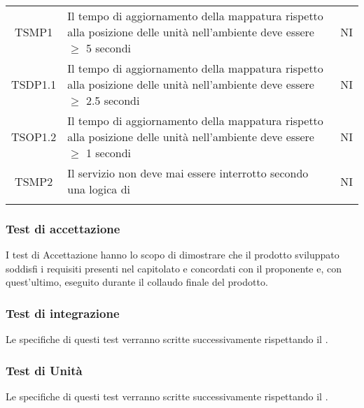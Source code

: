 \begin{longtable}[h!] { c  m{12cm} c}
		\hline
		
		TSMP1  &  Il tempo di aggiornamento della mappatura rispetto alla posizione delle unità nell'ambiente deve essere $\geq$ 5 secondi & NI \\
	
		TSDP1.1  & Il tempo di aggiornamento della mappatura rispetto alla posizione delle unità nell'ambiente deve essere $\geq$ 2.5 secondi & NI \\
		
		TSOP1.2  &  Il tempo di aggiornamento della mappatura rispetto alla posizione delle unità nell'ambiente deve essere $\geq$ 1 secondi & NI \\
										
		TSMP2	& Il servizio non deve mai essere interrotto secondo una logica di \glock{zero downtime}	& NI \\\\									
\end{longtable}

\subsubsection{Test di accettazione}
I test di Accettazione hanno lo scopo di dimostrare che il prodotto sviluppato soddisfi i requisiti presenti nel capitolato e concordati con il proponente e, con quest'ultimo, eseguito durante il collaudo finale del prodotto. 

\subsubsection{Test di integrazione}
Le specifiche di questi test verranno scritte successivamente rispettando il .
\subsubsection{Test di Unità}
Le specifiche di questi test verranno scritte successivamente rispettando il .




